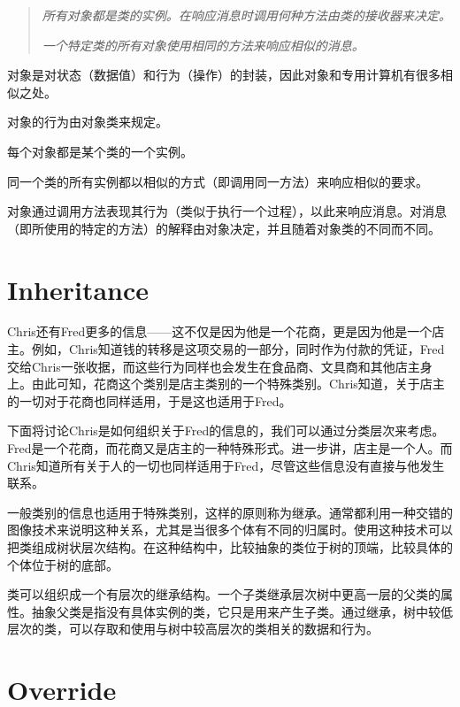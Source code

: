 \begin{quote}
\emph{所有对象都是类的实例。在响应消息时调用何种方法由类的接收器来决定。}

\emph{一个特定类的所有对象使用相同的方法来响应相似的消息。}
\end{quote}

对象是对状态（数据值）和行为（操作）的封装，因此对象和专用计算机有很多相似之处。

\begin{compactitem}
\item 对象的行为由对象类来规定。
\item 每个对象都是某个类的一个实例。
\item 同一个类的所有实例都以相似的方式（即调用同一方法）来响应相似的要求。
\end{compactitem}





对象通过调用方法表现其行为（类似于执行一个过程），以此来响应消息。对消息（即所使用的特定的方法）的解释由对象决定，并且随着对象类的不同而不同。



\section{Inheritance}

Chris还有Fred更多的信息——这不仅是因为他是一个花商，更是因为他是一个店主。例如，Chris知道钱的转移是这项交易的一部分，同时作为付款的凭证，Fred交给Chris一张收据，而这些行为同样也会发生在食品商、文具商和其他店主身上。由此可知，花商这个类别是店主类别的一个特殊类别。Chris知道，关于店主的一切对于花商也同样适用，于是这也适用于Fred。

下面将讨论Chris是如何组织关于Fred的信息的，我们可以通过分类层次来考虑。Fred是一个花商，而花商又是店主的一种特殊形式。进一步讲，店主是一个人。而Chris知道所有关于人的一切也同样适用于Fred，尽管这些信息没有直接与他发生联系。


一般类别的信息也适用于特殊类别，这样的原则称为继承。通常都利用一种交错的图像技术来说明这种关系，尤其是当很多个体有不同的归属时。使用这种技术可以把类组成树状层次结构。在这种结构中，比较抽象的类位于树的顶端，比较具体的个体位于树的底部。


类可以组织成一个有层次的继承结构。一个子类继承层次树中更高一层的父类的属性。抽象父类是指没有具体实例的类，它只是用来产生子类。通过继承，树中较低层次的类，可以存取和使用与树中较高层次的类相关的数据和行为。


\section{Override}


